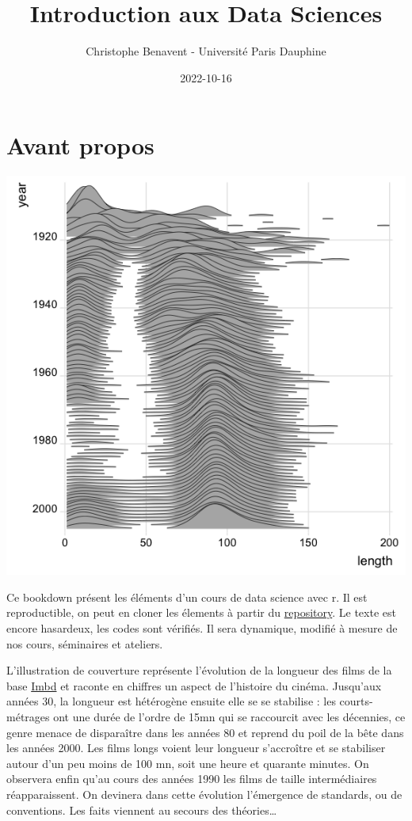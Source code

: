 \documentclass[
]{book}
\title{Introduction aux Data Sciences}
\author{Christophe Benavent - Université Paris Dauphine}
\date{2022-10-16}
\begin{document}
\maketitle

{
\setcounter{tocdepth}{1}
\tableofcontents
}
\hypertarget{avant-propos}{%
\chapter{Avant propos}\label{avant-propos}}

\includegraphics{./Images/ggridge.png}

Ce bookdown présent les éléments d'un cours de data science avec r. Il est reproductible, on peut en cloner les élements à partir du \href{https://github.com/BenaventC/DataScienceBook}{repository}. Le texte est encore hasardeux, les codes sont vérifiés. Il sera dynamique, modifié à mesure de nos cours, séminaires et ateliers.

L'illustration de couverture représente l'évolution de la longueur des films de la base \href{https://www.imdb.com/}{Imbd} et raconte en chiffres un aspect de l'histoire du cinéma. Jusqu'aux années 30, la longueur est hétérogène ensuite elle se se stabilise : les courts-métrages ont une durée de l'ordre de 15mn qui se raccourcit avec les décennies, ce genre menace de disparaître dans les années 80 et reprend du poil de la bête dans les années 2000. Les films longs voient leur longueur s'accroître et se stabiliser autour d'un peu moins de 100 mn, soit une heure et quarante minutes. On observera enfin qu'au cours des années 1990 les films de taille intermédiaires réapparaissent. On devinera dans cette évolution l'émergence de standards, ou de conventions. Les faits viennent au secours des théories\ldots{}
\end{document}

